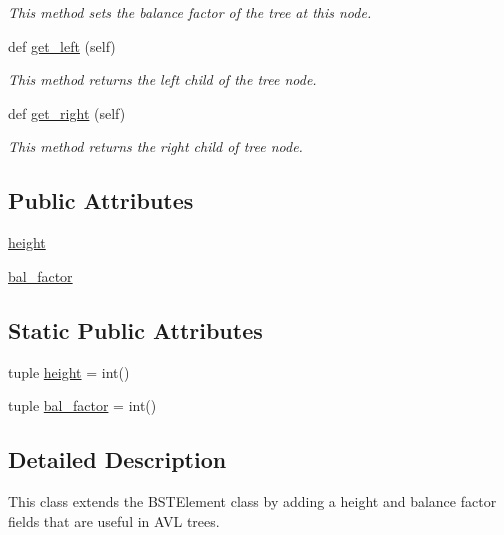\begin{DoxyCompactItemize}
\begin{DoxyCompactList}\small\item\em This method sets the balance factor of the tree at this node. \end{DoxyCompactList}\item 
def \hyperlink{class_bridges_1_1avl__tree__element_1_1_a_v_l_tree_element_af534fdbf8ec5fe48aaf02ef9b8537b81}{get\+\_\+left} (self)
\begin{DoxyCompactList}\small\item\em This method returns the left child of the tree node. \end{DoxyCompactList}\item 
def \hyperlink{class_bridges_1_1avl__tree__element_1_1_a_v_l_tree_element_afc0e1b61a4e6e07192234d0975daaa9c}{get\+\_\+right} (self)
\begin{DoxyCompactList}\small\item\em This method returns the right child of tree node. \end{DoxyCompactList}\end{DoxyCompactItemize}
\subsection*{Public Attributes}
\begin{DoxyCompactItemize}
\item 
\hyperlink{class_bridges_1_1avl__tree__element_1_1_a_v_l_tree_element_ad4e11b61cca78051aea548c7fcb4e4fb}{height}
\item 
\hyperlink{class_bridges_1_1avl__tree__element_1_1_a_v_l_tree_element_a9187ba8eeedf0e359f020b443275c356}{bal\+\_\+factor}
\end{DoxyCompactItemize}
\subsection*{Static Public Attributes}
\begin{DoxyCompactItemize}
\item 
tuple \hyperlink{class_bridges_1_1avl__tree__element_1_1_a_v_l_tree_element_a1f288ee86bb9a50401d792c5004e6177}{height} = int()
\item 
tuple \hyperlink{class_bridges_1_1avl__tree__element_1_1_a_v_l_tree_element_aecb3dfe8fcc83d6c5f46adddbed168e4}{bal\+\_\+factor} = int()
\end{DoxyCompactItemize}


\subsection{Detailed Description}
This class extends the B\+S\+T\+Element class by adding a height and balance factor fields that are useful in A\+V\+L trees. 

